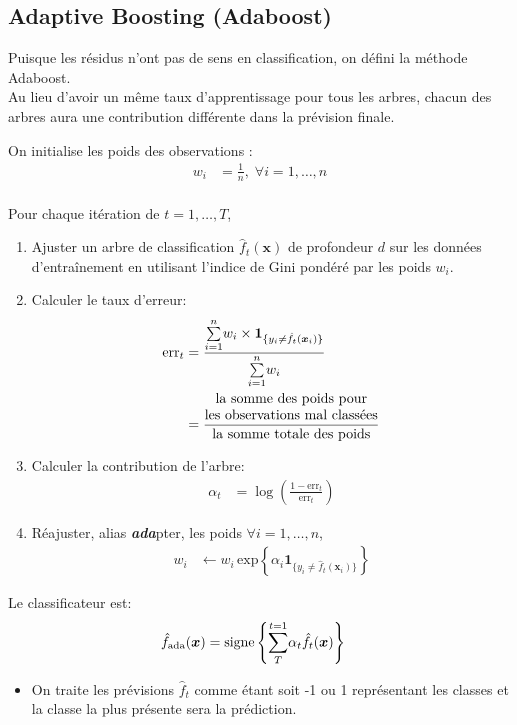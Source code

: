 \documentclass[10pt, french]{article}
\begin{document}
\begin{multicols*}{3}
\subsection*{Adaptive Boosting (Adaboost)}
Puisque les résidus n'ont pas de sens en classification, on défini la méthode Adaboost. \\

Au lieu d'avoir un même taux d'apprentissage pour tous les arbres, chacun des arbres aura une contribution différente dans la prévision finale.

\begin{algo2}
On initialise les poids des observations :
\begin{align*}
	w_{i}	
	&=	\frac{1}{n}, \;	\forall i = 1, \dots, n	\\
\end{align*}

Pour chaque itération de $t = 1, \dots, T$,
\begin{enumerate}[leftmargin  = *]
	\item	Ajuster un arbre de classification $\hat{f}_{t}(\bm{x})$ de profondeur $d$ sur les données d'entraînement en utilisant l'indice de Gini pondéré par les poids $w_{i}$.
	\item	Calculer le taux d'erreur:
		\begin{align*}
		\text{err}_{t}	
		&=	\frac{\sumz{n}{i = 1} w_{i} \times \bm{1}_{\{ y_{i} \neq \hat{f}_{t}(\bm{x}_{i}) \}}}{\sumz{n}{i = 1} w_{i}}	\\
		&=	\frac{\shortstack{la somme des poids pour\\ les observations mal classées}}{\text{la somme totale des poids}}
		\end{align*}
	\item	Calculer la contribution de l'arbre:
		\begin{align*}
			\alpha_{t}	
			&=	\log\left(\frac{1 - \text{err}_{t}}{\text{err}_{t}}\right)
		\end{align*}
	\item	Réajuster, alias \textit{\textbf{ada}}pter, les poids $\forall i = 1, \dots, n$,
		\begin{align*}
		w_{i}
		&\leftarrow	w_{i}\, \text{exp}\left\{\alpha_{i} \bm{1}_{\{ y_{i} \neq \hat{f}_{t}(\bm{x}_{i}) \}}\right\}
		\end{align*}
\end{enumerate}

Le classificateur est:
\begin{align*}
	\hat{f}_{\text{ada}}(\bm{x})	
	&=	\text{signe}\left\{ \overset{t = 1}{\underset{T}{\sum}} \alpha_{t} \hat{f}_{t} (\bm{x}) \right\}
\end{align*}
\begin{itemize}[leftmargin = *]
	\item	On traite les prévisions $\hat{f}_{t}$ comme étant soit -1 ou 1 représentant les classes et la classe la plus présente sera la prédiction.
\end{itemize}
\end{algo2}



\end{multicols*}
\end{document}
